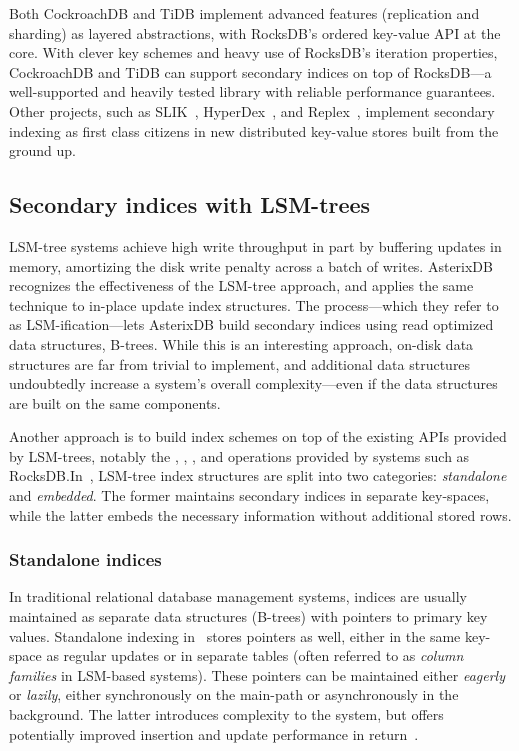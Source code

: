Both CockroachDB and TiDB implement advanced features (\eg replication and
sharding) as layered abstractions, with RocksDB's ordered key-value API at the
core. With clever key schemes and heavy use of RocksDB's iteration properties,
CockroachDB and TiDB can support secondary indices on top of RocksDB---a
well-supported and heavily tested library with reliable performance guarantees.
Other projects, such as SLIK~\cite{slik}, HyperDex~\cite{hyperdex}, and
Replex~\cite{replex}, implement secondary indexing as first class citizens in
new distributed key-value stores built from the ground up.

\subsection{Secondary indices with LSM-trees}

LSM-tree systems achieve high write throughput in part by buffering updates in
memory, amortizing the disk write penalty across a batch of writes.
AsterixDB~\cite{asterix-storage} recognizes the effectiveness of the LSM-tree
approach, and applies the same technique to in-place update index structures.
The process---which they refer to as LSM-ification---lets AsterixDB build
secondary indices using read optimized data structures, \eg B-trees. While this
is an interesting approach, on-disk data structures are far from trivial to
implement, and additional data structures undoubtedly increase a system's
overall complexity---even if the data structures are built on the same
components.

Another approach is to build index schemes on top of the existing APIs provided
by LSM-trees, notably the , , , and 
operations provided by systems such as RocksDB.\@ In~\cite{lsm-comparison},
LSM-tree index structures are split into two categories: \textit{standalone} and
\textit{embedded}. The former maintains secondary indices in separate
key-spaces, while the latter embeds the necessary information without additional
stored rows.

\subsubsection{Standalone indices}

In traditional relational database management systems, indices are usually
maintained as separate data structures (\eg B-trees) with pointers to primary
key values. Standalone indexing in~\cite{lsm-comparison} stores pointers as
well, either in the same key-space as regular updates or in separate tables
(often referred to as \textit{column families} in LSM-based systems). These
pointers can be maintained either \textit{eagerly} or \textit{lazily}, \eg
either synchronously on the main-path or asynchronously in the background. The
latter introduces complexity to the system, but offers potentially improved
insertion and update performance in return~\cite{deli, pnuts}.


